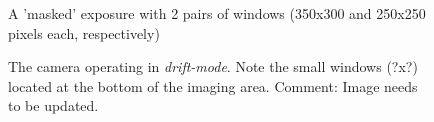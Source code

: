 \begin{figure}  
  \centering
  \setlength{\fboxsep}{0pt}
  \setlength{\fboxrule}{1pt}
  \caption{A 'masked' exposure with 2 pairs of windows (350x300 and 250x250 pixels each, respectively)}
  \label{fig:V713Cep}
\end{figure}

\begin{figure}  
  \centering
  \setlength{\fboxsep}{0pt}
  \setlength{\fboxrule}{1pt}
  \caption{The camera operating in \emph{drift-mode}. Note the small windows (?x?) located at the bottom of the imaging area. Comment: Image needs to be updated. }
  \label{fig:V713Cep}
\end{figure}

